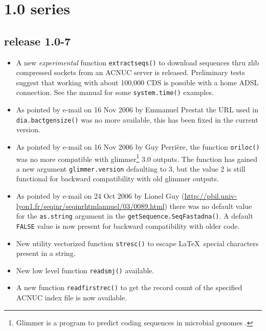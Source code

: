 \documentclass{article}
\begin{document}
\section{1.0 series}

\subsection{release 1.0-7}

\begin{itemize}

\item A new \emph{experimental} function \texttt{extractseqs()} to download
sequences thru zlib compressed sockets from an ACNUC server is released. 
Preliminary tests suggest that working with about 100,000 CDS is possible with 
a home ADSL connection. See the manual for some \texttt{system.time()}
examples.

\item As pointed by e-mail on 16 Nov 2006 by Emmanuel Prestat the URL
used in \texttt{dia.bactgensize()} was no more available, this has been fixed
in the current version.

\item As pointed by e-mail on 16 Nov 2006 by Guy Perri{\`e}re, the
function \texttt{oriloc()} was no more compatible with glimmer\footnote{
Glimmer is a program to predict coding sequences in microbial genomes \cite{SalzbergSL1998, DelcherAL1999}.
} 3.0
outputs. The function has gained a new argument \texttt{glimmer.version}
defaulting to 3, but the value 2 is still functional for backward compatibility
with old glimmer outputs.

\item As pointed by e-mail on 24 Oct 2006 by Lionel Guy 
(\url{http://pbil.univ-lyon1.fr/seqinr/seqinrhtmlannuel/03/0089.html})
there was no default value for the \texttt{as.string} argument in
the \texttt{getSequence.SeqFastadna()}. A default \texttt{FALSE}
value is now present for backward compatibility with older code.

\item New utility vectorized function \texttt{stresc()}  to escape \LaTeX~special 
characters present in a string.

\item New low level function \texttt{readsmj()} available.

\item A new function \texttt{readfirstrec()} to get 
the record count of the specified ACNUC index file is now available.


\end{itemize}
\end{document}
